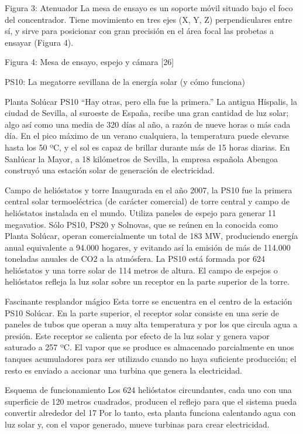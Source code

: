 \documentclass[12pt]{article}
\begin{document}
Figura 3: Atenuador
            	La mesa de ensayo es un soporte móvil situado bajo el foco del concentrador. Tiene movimiento en tres ejes (X, Y, Z) perpendiculares entre sí, y sirve para posicionar con gran precisión en el área focal las probetas a ensayar (Figura 4). 

Figura 4: Mesa de ensayo, espejo y cámara
[26]


PS10: La megatorre sevillana de la energía solar (y cómo funciona)
 

Planta Solúcar PS10
“Hay otras, pero ella fue la primera.”
La antigua Híspalis, la ciudad de Sevilla, al suroeste de España, recibe una gran cantidad de luz solar; algo así como una media de 320 días al año, a razón de nueve horas o más cada día. En el pico máximo de un verano cualquiera, la temperatura puede elevarse hasta los 50 ºC, y el sol es capaz de brillar durante más de 15 horas diarias.
En Sanlúcar la Mayor, a 18 kilómetros de Sevilla, la empresa española Abengoa construyó una estación solar de generación de electricidad.

Campo de helióstatos y torre
Inaugurada en el año 2007, la PS10 fue la primera central solar termoeléctrica (de carácter comercial) de torre central y campo de helióstatos instalada en el mundo. Utiliza paneles de espejo para generar 11 megavatios.
Sólo PS10, PS20 y Solnovas, que se reúnen en la conocida como Planta Solúcar, operan comercialmente un total de 183 MW, produciendo energía anual equivalente a 94.000 hogares, y evitando así la emisión de más de 114.000 toneladas anuales de CO2 a la atmósfera.
La PS10 está formada por 624 helióstatos y una torre solar de 114 metros de altura. El campo de espejos o helióstatos refleja la luz solar sobre un receptor en la parte superior de la torre.

Fascinante resplandor mágico
Esta torre se encuentra en el centro de la estación PS10 Solúcar. En la parte superior, el receptor solar consiste en una serie de paneles de tubos que operan a muy alta temperatura y por los que circula agua a presión. Este receptor se calienta por efecto de la luz solar y genera vapor saturado a 257 ºC. El vapor que se produce es almacenado parcialmente en unos tanques acumuladores para ser utilizado cuando no haya suficiente producción; el resto es enviado a accionar una turbina que genera la electricidad.

Esquema de funcionamiento
Los 624 helióstatos circundantes, cada uno con una superficie de 120 metros cuadrados, producen el reflejo para que el sistema pueda convertir alrededor del 17%
Por lo tanto, esta planta funciona calentando agua con luz solar y, con el vapor generado, mueve turbinas para crear electricidad.
\end{document}
